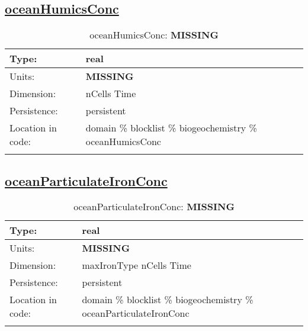 \subsection[oceanHumicsConc]{\hyperref[sec:var_tab_biogeochemistry]{oceanHumicsConc}}
\label{subsec:var_sec_biogeochemistry_oceanHumicsConc}
\begin{center}
\begin{longtable}{| p{2.0in} | p{4.0in} |}
        \hline 
        Type: & real \\
        \hline 
        Units: & {\bf \color{red} MISSING} \\
        \hline 
        Dimension: & nCells Time \\
        \hline 
        Persistence: & persistent \\
        \hline 
         Location in code: & domain \% blocklist \% biogeochemistry \% oceanHumicsConc \\
         \hline 
    \caption{oceanHumicsConc: {\bf \color{red} MISSING}}
\end{longtable}
\end{center}
\subsection[oceanParticulateIronConc]{\hyperref[sec:var_tab_biogeochemistry]{oceanParticulateIronConc}}
\label{subsec:var_sec_biogeochemistry_oceanParticulateIronConc}
\begin{center}
\begin{longtable}{| p{2.0in} | p{4.0in} |}
        \hline 
        Type: & real \\
        \hline 
        Units: & {\bf \color{red} MISSING} \\
        \hline 
        Dimension: & maxIronType nCells Time \\
        \hline 
        Persistence: & persistent \\
        \hline 
         Location in code: & domain \% blocklist \% biogeochemistry \% oceanParticulateIronConc \\
         \hline 
    \caption{oceanParticulateIronConc: {\bf \color{red} MISSING}}
\end{longtable}
\end{center}
